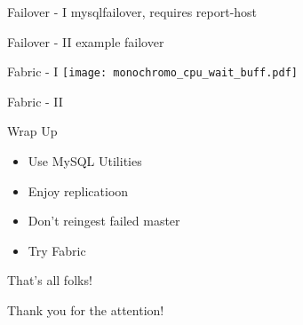 \documentclass{beamer}[10]
\begin{document}



\begin{pyframe}{Failover - I}
mysqlfailover, requires report-host
\end{pyframe}


\begin{pyframe}{Failover - II}
example failover
\end{pyframe}

\begin{pyframe}{Fabric - I}
\texttt{[image: monochromo\_cpu\_wait\_buff.pdf]}
\end{pyframe}

\begin{pyframe}{Fabric - II}
\end{pyframe}


\begin{pyframe}{Wrap Up}
\begin{itemize}
\item Use MySQL Utilities
\item Enjoy replicatioon
\item Don't reingest failed master
\item Try Fabric
\end{itemize}
\end{pyframe}

\begin{pyframe}{That's all folks!}
\begin{center}
Thank you for the attention! \\\\
\insertauthor
\end{center}
\end{pyframe}
\end{document}
